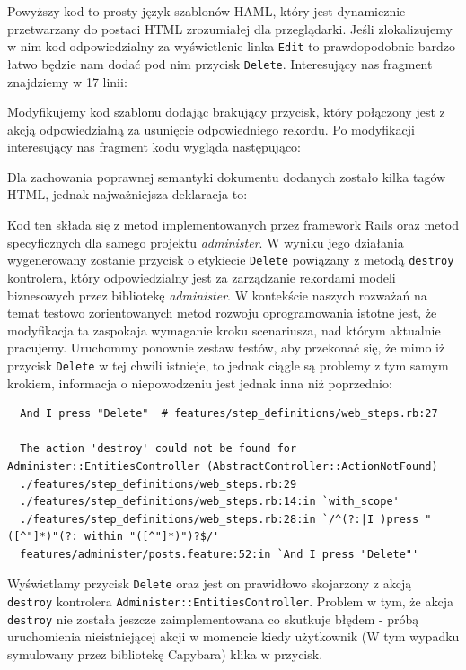   Powyższy kod to prosty język szablonów HAML, który jest dynamicznie przetwarzany do postaci HTML zrozumiałej dla przeglądarki. Jeśli zlokalizujemy w nim kod odpowiedzialny za wyświetlenie linka \texttt{Edit} to prawdopodobnie bardzo łatwo będzie nam dodać pod nim przycisk \texttt{Delete}. Interesujący nas fragment znajdziemy w 17 linii:
  
  
  
  Modyfikujemy kod szablonu dodając brakujący przycisk, który połączony jest z akcją odpowiedzialną za usunięcie odpowiedniego rekordu. Po modyfikacji interesujący nas fragment kodu wygląda następująco:
  
  
  
  Dla zachowania poprawnej semantyki dokumentu dodanych zostało kilka tagów HTML, jednak najważniejsza deklaracja to:
  
  
  
  Kod ten składa się z metod implementowanych przez framework Rails oraz metod specyficznych dla samego projektu \emph{administer}. W wyniku jego działania wygenerowany zostanie przycisk o etykiecie \texttt{Delete} powiązany z metodą \texttt{destroy} kontrolera, który odpowiedzialny jest za zarządzanie rekordami modeli biznesowych przez bibliotekę \emph{administer}. W kontekście naszych rozważań na temat testowo zorientowanych metod rozwoju oprogramowania istotne jest, że modyfikacja ta zaspokaja wymaganie kroku scenariusza, nad którym aktualnie pracujemy. Uruchommy ponownie zestaw testów, aby przekonać się, że mimo iż przycisk \texttt{Delete} w tej chwili istnieje, to jednak ciągle są problemy z tym samym krokiem, informacja o niepowodzeniu jest jednak inna niż poprzednio:
  
  \begin{lstlisting}
  And I press "Delete"  # features/step_definitions/web_steps.rb:27
  
  The action 'destroy' could not be found for Administer::EntitiesController (AbstractController::ActionNotFound)
  ./features/step_definitions/web_steps.rb:29
  ./features/step_definitions/web_steps.rb:14:in `with_scope'
  ./features/step_definitions/web_steps.rb:28:in `/^(?:|I )press "([^"]*)"(?: within "([^"]*)")?$/'
  features/administer/posts.feature:52:in `And I press "Delete"'
  \end{lstlisting}
  
  Wyświetlamy przycisk \texttt{Delete} oraz jest on prawidłowo skojarzony z akcją \texttt{destroy} kontrolera \texttt{Administer::EntitiesController}. Problem w tym, że akcja \texttt{destroy} nie została jeszcze zaimplementowana co skutkuje błędem - próbą uruchomienia nieistniejącej akcji w momencie kiedy użytkownik (W tym wypadku symulowany przez bibliotekę Capybara) klika w przycisk.
  
